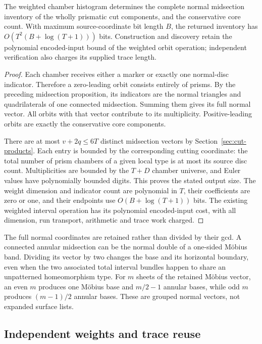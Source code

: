 \begin{proposition}
The weighted chamber histogram determines the complete normal midsection
inventory of the wholly prismatic cut components, and the conservative
core count. With maximum source-coordinate bit length $B$, the returned
inventory has $O(T^2(B+\log(T+1)))$ bits. Construction and discovery retain
the polynomial encoded-input bound of the weighted orbit operation;
independent verification also charges its supplied trace length.
\end{proposition}
\begin{proof}
Each chamber receives either a marker or exactly one normal-disc indicator.
Therefore a zero-leading orbit consists entirely of prisms. By the preceding
midsection proposition, its indicators are the normal triangles and
quadrilaterals of one connected midsection. Summing them gives its full
normal vector. All orbits with that vector contribute to its multiplicity.
Positive-leading orbits are exactly the conservative core components.

There are at most $v+2q\le6T$ distinct midsection vectors by
Section~\ref{sec:cut-products}. Each entry is bounded by the corresponding
cutting coordinate: the total number of prism chambers of a given local
type is at most its source disc count. Multiplicities are bounded by the
$T+D$ chamber universe, and Euler values have polynomially bounded digits.
This proves the stated output size. The weight dimension and indicator
count are polynomial in $T$, their coefficients are zero or one, and their
endpoints use $O(B+\log(T+1))$ bits. The existing weighted interval operation
has its polynomial encoded-input cost\cite[Theorem 16]{aht-orbits}, with
all dimension, run transport, arithmetic and trace work charged.
\end{proof}

The full normal coordinates are retained rather than divided by their gcd.
A connected annular midsection can be the normal double of a one-sided
M\"obius band. Dividing its vector by two changes the base and its horizontal
boundary, even when the two associated total interval bundles happen to
share an unpatterned homeomorphism type. For $m$ sheets of the retained
M\"obius vector, an even $m$ produces one M\"obius base and $m/2-1$ annular
bases, while odd $m$ produces $(m-1)/2$ annular bases. These are grouped
normal vectors, not expanded surface lists.

\subsection{Independent weights and trace reuse}

